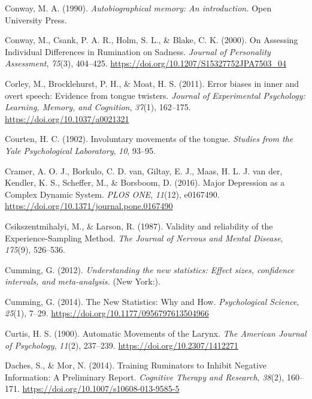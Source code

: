 \documentclass[a4paper,12pt,twoside,openright,oldfontcommands,final]{memoir}
\begin{document}
\leavevmode\hypertarget{ref-conway_autobiographical_1990}{}%
Conway, M. A. (1990). \emph{Autobiographical memory: An introduction.} Open University Press.

\leavevmode\hypertarget{ref-conway_assessing_2000}{}%
Conway, M., Csank, P. A. R., Holm, S. L., \& Blake, C. K. (2000). On Assessing Individual Differences in Rumination on Sadness. \emph{Journal of Personality Assessment}, \emph{75}(3), 404--425. \url{https://doi.org/10.1207/S15327752JPA7503_04}

\leavevmode\hypertarget{ref-corley_error_2011}{}%
Corley, M., Brocklehurst, P. H., \& Moat, H. S. (2011). Error biases in inner and overt speech: Evidence from tongue twisters. \emph{Journal of Experimental Psychology: Learning, Memory, and Cognition}, \emph{37}(1), 162--175. \url{https://doi.org/10.1037/a0021321}

\leavevmode\hypertarget{ref-courten_involuntary_1902}{}%
Courten, H. C. (1902). Involuntary movements of the tongue. \emph{Studies from the Yale Psychological Laboratory}, \emph{10}, 93--95.

\leavevmode\hypertarget{ref-cramer_major_2016}{}%
Cramer, A. O. J., Borkulo, C. D. van, Giltay, E. J., Maas, H. L. J. van der, Kendler, K. S., Scheffer, M., \& Borsboom, D. (2016). Major Depression as a Complex Dynamic System. \emph{PLOS ONE}, \emph{11}(12), e0167490. \url{https://doi.org/10.1371/journal.pone.0167490}

\leavevmode\hypertarget{ref-csikszentmihalyi_validity_1987}{}%
Csikszentmihalyi, M., \& Larson, R. (1987). Validity and reliability of the Experience-Sampling Method. \emph{The Journal of Nervous and Mental Disease}, \emph{175}(9), 526--536.

\leavevmode\hypertarget{ref-Cumming2012}{}%
Cumming, G. (2012). \emph{Understanding the new statistics: Effect sizes, confidence intervals, and meta-analysis.} (New York:).

\leavevmode\hypertarget{ref-cumming_new_2014}{}%
Cumming, G. (2014). The New Statistics: Why and How. \emph{Psychological Science}, \emph{25}(1), 7--29. \url{https://doi.org/10.1177/0956797613504966}

\leavevmode\hypertarget{ref-curtis_automatic_1900}{}%
Curtis, H. S. (1900). Automatic Movements of the Larynx. \emph{The American Journal of Psychology}, \emph{11}(2), 237--239. \url{https://doi.org/10.2307/1412271}

\leavevmode\hypertarget{ref-daches_training_2014}{}%
Daches, S., \& Mor, N. (2014). Training Ruminators to Inhibit Negative Information: A Preliminary Report. \emph{Cognitive Therapy and Research}, \emph{38}(2), 160--171. \url{https://doi.org/10.1007/s10608-013-9585-5}
\end{document}
